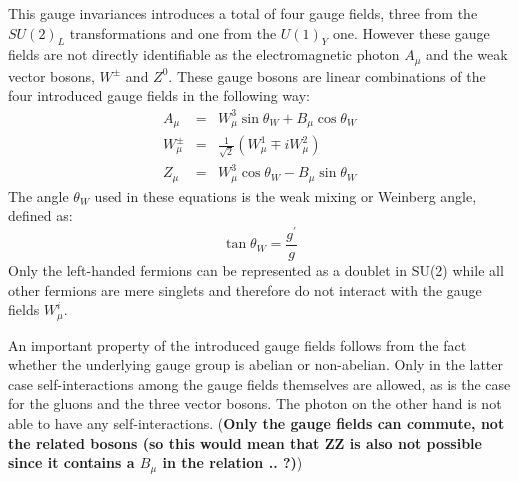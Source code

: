 \begin{myindentpar}
\begin{description}
    This gauge invariances introduces a total of four gauge fields, three from the $SU(2)_L$ transformations and one from the $U(1)_Y$ one.
    However these gauge fields are not directly identifiable as the electromagnetic photon $A_{\mu}$ and the weak vector bosons, $W^{\pm}$ and $Z^{0}$.
    These gauge bosons are linear combinations of the four introduced gauge fields in the following way: %
    \begin{eqnarray}
     A_{\mu} & = & W_{\mu}^{3} \sin \theta_{W} + B_{\mu} \cos \theta_{W} \nonumber \\
     W_{\mu}^{\pm} & = & \frac{1}{\sqrt{2}} \left( W_{\mu}^{1} \mp i W_{\mu}^{2} \right) \label{eq::EWGaugeBosons} \\
     Z_{\mu} & = & W_{\mu}^{3} \cos \theta_{W} - B_{\mu} \sin \theta_{W} \nonumber
    \end{eqnarray}
    The angle $\theta_{W}$ used in these equations is the weak mixing or Weinberg angle, defined as:
    \begin{equation}
     \tan \theta_{W} = \frac{g^{'}}{g}
    \end{equation}
    Only the left-handed fermions can be represented as a doublet in SU(2) while all other fermions are mere singlets and therefore do not interact with the gauge fields $W_{\mu}^{i}$. 
   \end{description}
\end{myindentpar}

An important property of the introduced gauge fields follows from the fact whether the underlying gauge group is abelian or non-abelian. Only in the latter case self-interactions among the gauge fields themselves are allowed, as is the case for the gluons and the three vector bosons. The photon on the other hand is not able to have any self-interactions. (\textbf{Only the gauge fields can commute, not the related bosons (so this would mean that ZZ is also not possible since it contains a $B_{\mu}$ in the relation .. ?)})

